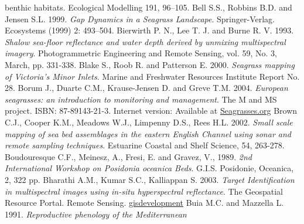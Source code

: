 \documentclass[11pt]{article}
\begin{document}
\begin{thebibliography}{999}
{benthic habitats}. Ecological Modelling 191, 96–105. \pageref{Bakran-Petricioli06}
Bell S.S., Robbins B.D. and Jensen S.L. 1999. \emph{Gap Dynamics in a Seagrass Landscape}.
Springer-Verlag. Ecosystems (1999) 2: 493–504. \pageref{Bell99}
Bierwirth P. N., Lee T. J. and Burne R. V. 1993. \emph{Shalow sea-floor reflectance and water
depth derived by unmixing multispectral imagery}. Photogrammetric Engineering and Remote
Sensing, vol. 59, No. 3, March, pp. 331-338. \pageref{Bierwirth93}
Blake S., Roob R. and Patterson E. 2000. \emph{Seagrass mapping of Victoria's Minor Inlets}.
Marine and Freshwater Resources Institute Report No. 28. \pageref{Blake00}
Borum J., Duarte C.M., Krause-Jensen D. and Greve T.M. 2004. \emph{European seagrasses: an introduction to monitoring and management}. The M and MS project. ISBN: 87-89143-21-3.
Internet version: Available at \href{http://www.seagrasses.org}{Seagrasses.org} \pageref{Borum04}
Brown C.J., Cooper K.M., Meadows W.J., Limpenny D.S., Rees H.L. 2002. \emph{Small scale mapping of sea bed assemblages in the eastern English Channel using sonar and remote
sampling techniques}. Estuarine Coastal and Shelf Science, 54, 263-278. \pageref{Brown02}
Boudouresque C.F., Meinesz, A., Fresi, E. and Gravez, V., 1989. \emph{2nd International Workshop on \textit{Posidonia oceanica} Beds}. G.I.S. Posidonie, Oceanica, 2, 322 pp. \pageref{Boudouresque89}
Bharathi A.M., Kumar S.C., Kalliappan S. 2003. \emph{Target Identification in multispectral images using \textit{in-situ} hyperspectral reflectance}. The Geospatial Resource Portal. Remote Sensing.
\href{www.gisdevelopment.net}{gisdevelopment} \pageref{Bharathi03}
Buia M.C. and Mazzella L. 1991. \emph{Reproductive phenology of the Mediterranean
}
\end{thebibliography}
\end{document}
